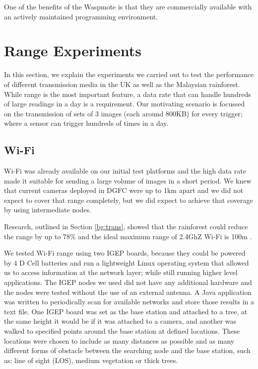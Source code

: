 One of the benefits of the Waspmote is that they are commercially available with an actively maintained programming environment.

\section{Range Experiments}\label{tech:wireless}
	In this section, we explain the experiments we carried out to test the performance of different transmission media in the UK as well as the Malaysian rainforest. While range is the most important feature, a data rate that can handle hundreds of large readings in a day is a requirement. Our motivating scenario is focussed on the transmission of sets of 3 images (each around 800KB) for every trigger; where a sensor can trigger hundreds of times in a day.

\subsection{Wi-Fi}\label{tec:wifirange}
Wi-Fi was already available on our initial test platforms and the high data rate made it suitable for sending a large volume of images in a short period. We knew that current cameras deployed in DGFC were up to 1km apart and we did not expect to cover that range completely, but we did expect to achieve that coverage by using intermediate nodes.

Research, outlined in Section \ref{bg:trans}, showed that the rainforest could reduce the range by up to 78\% and the ideal maximum range of 2.4GhZ Wi-Fi is 100m \cite{Dhawan2007}. 

We tested Wi-Fi range using two IGEP boards, because they could be powered by 4 D Cell batteries and run a lightweight Linux operating system that allowed us to access information at the network layer; while still running higher level applications.	The IGEP nodes we used did not have any additional hardware and the nodes were tested without the use of an external antenna. A Java application was written to periodically scan for available networks and store those results in a text file. One IGEP board was set as the base station and attached to a tree, at the same height it would be if it was attached to a camera, and another was walked to specified points around the base station at defined locations. These locations were chosen to include as many distances as possible and as many different forms of obstacle between the searching node and the base station, such as: line of sight (LOS), medium vegetation or thick trees.
			
